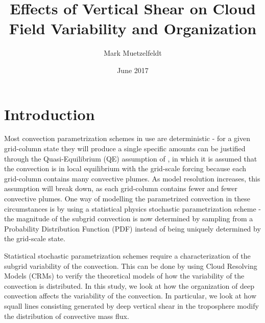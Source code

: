 \documentclass[11pt,a4paper]{article}
\title{Effects of Vertical Shear on Cloud Field Variability and Organization }
\author{Mark Muetzelfeldt}
\date{June 2017}
\newcommand\todo[1]{\textbf{TODO: #1}}
\begin{document}
\maketitle
\section{Introduction}

Most convection parametrization schemes in use are deterministic - for a given grid-column state they will produce a single specific amounts can be justified through the Quasi-Equilibrium (QE) assumption of \cite{arakawa1974interaction}, in which it is assumed that the convection is in local equilibrium with the grid-scale forcing because each grid-column contains many convective plumes. As model resolution increases, this assumption will break down, as each grid-column contains fewer and fewer convective plumes. One way of modelling the parametrized convection in these circumstances is by using a statistical physics stochastic parametrization scheme \parencite{berner2017stochastic} - the magnitude of the subgrid convection is now determined by sampling from a Probability Distribution Function (PDF) instead of being uniquely determined by the grid-scale state.

Statistical stochastic parametrization schemes require a characterization of the subgrid variability of the convection. This can be done by using Cloud Resolving Models (CRMs) to verify the theoretical models of how the variability of the convection is distributed. In this study, we look at how the organization of deep convection affects the variability of the convection. In particular, we look at how squall lines consisting generated by deep vertical shear in the troposphere modify the distribution of convective mass flux.

\end{document}

